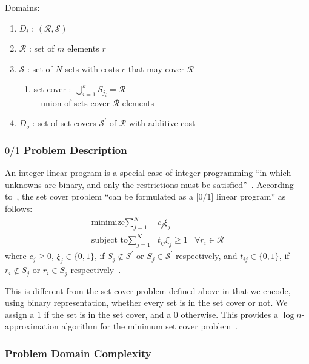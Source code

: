 \documentclass[conference]{IEEEtran}
\begin{document}
Domains:
\begin{enumerate}
  \item[] $D_i$ : $(\mathcal{R,S})$
  \item[] $\mathcal{R}$ : set of $m$ elements $r$
  \item[] $\mathcal{S}$ : set of $N$ sets with costs $c$ that may cover
    $\mathcal{R}$
    \begin{enumerate}
      \item[] set cover : $\bigcup\limits_{i=1}^k S_{j_i} =
        \mathcal{R}$~\cite[Eq.~3.12]{christofides1975}\\ 
        -- union of sets cover $\mathcal{R}$
        elements
    \end{enumerate}
  \item[] $D_o$ : set of set-covers $\mathcal{S}^\prime$ of $\mathcal{R}$ with
    additive cost
\end{enumerate}

\subsubsection{$0/1$ Problem Description}
An integer linear program is a special case of integer programming ``in which
unknowns are binary, and only the restrictions must be
satisfied''~\cite{wiki:IP}. According to~\cite{christofides1975}, the set cover
problem ``can be formulated as a [$0/1$] linear program'' as follows:
\begin{align*}
  \text{minimize} \sum\limits_{j=1}^N &c_j \xi_j\\
  \text{subject to} \sum\limits_{j=1}^N &t_{ij} \xi_j \geq 1 &\forall
  r_i \in \mathcal{R}
\end{align*}
where ${c_j \geq 0}$, ${\xi_j \in \lbrace 0,1 \rbrace}$, if ${S_j \notin
\mathcal{S}^\prime}$ or ${S_j \in \mathcal{S}^\prime}$ respectively, and ${t_{ij}
\in \lbrace 0,1 \rbrace}$, if ${r_i \notin S_j}$ or ${r_i \in S_j}$
respectively~\cite[p. 39-40]{christofides1975}.

This is different from the set cover problem defined above in that we encode,
using binary representation, whether every set is in the set cover or not.
We assign a $1$ if the set is in the set cover, and a $0$ otherwise. This
provides a $\log{n}$-approximation algorithm for the minimum
set cover problem~\cite{wiki:SCP}.

\subsubsection{Problem Domain Complexity} \label{sec:pdComplex}
\end{document}
